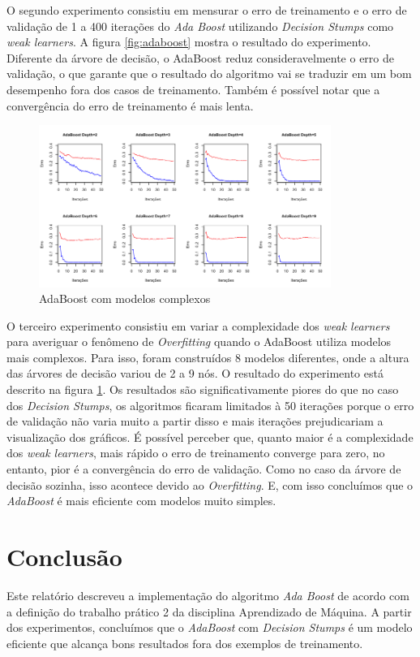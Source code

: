 \documentclass{article}
\begin{document}
O segundo experimento consistiu em mensurar o erro de treinamento e o erro de validação de 1 a 400 iterações do \textit{Ada Boost}
utilizando \textit{Decision Stumps} como \textit{weak learners}. A figura \ref{fig:adaboost} mostra o resultado do experimento.
Diferente da árvore de decisão, o AdaBoost reduz consideravelmente o erro de validação, o que garante que o resultado do algoritmo
vai se traduzir em um bom desempenho fora dos casos de treinamento. Também é possível notar que a convergência do erro de treinamento
é mais lenta.

\begin{figure}
  \center
  \includegraphics[width=360px]{adaboost_varying_depths.png}
  \caption{AdaBoost com modelos complexos}
  \label{fig:adaboost_depth}
\end{figure}

O terceiro experimento consistiu em variar a complexidade dos \textit{weak learners} para averiguar o
fenômeno de \textit{Overfitting} quando o AdaBoost utiliza modelos mais complexos. Para isso,
foram construídos 8 modelos diferentes, onde a altura das árvores de decisão variou de 2 a 9 nós. O resultado do experimento está 
descrito na figura \ref{fig:adaboost_depth}. Os resultados são significativamente piores do que no caso dos \textit{Decision Stumps},
os algoritmos ficaram limitados à 50 iterações porque o erro de validação não varia muito a partir disso e mais iterações prejudicariam 
a visualização dos gráficos. É possível perceber que, quanto maior é a complexidade dos \textit{weak learners}, mais rápido o erro
de treinamento converge para zero, no entanto, pior é a convergência do erro de validação. Como no caso da árvore de decisão sozinha,
isso acontece devido ao \textit{Overfitting}. E, com isso concluímos que o \textit{AdaBoost} é mais eficiente com modelos 
muito simples.

\section{Conclusão}

Este relatório descreveu a implementação do algoritmo \textit{Ada Boost} de acordo com a definição do 
trabalho prático 2 da disciplina Aprendizado de Máquina. A partir dos experimentos, concluímos que o 
\textit{AdaBoost} com \textit{Decision Stumps} é um modelo eficiente que alcança bons resultados
fora dos exemplos de treinamento.
\end{document}

